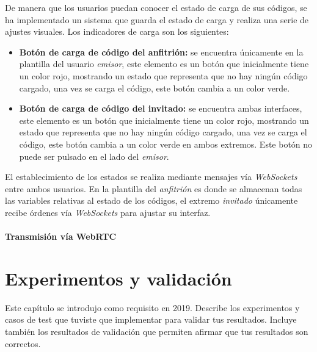 \documentclass[a4paper, 12pt]{book}
\begin{document}
De manera que los usuarios puedan conocer el estado de carga de sus códigos, se ha implementado un sistema que guarda el estado de carga y realiza una serie de ajustes visuales. Los indicadores de carga son los siguientes:

\begin{itemize}
\item \textbf{Botón de carga de código del anfitrión:} se encuentra únicamente en la plantilla del usuario \emph{emisor}, este elemento es un botón que inicialmente tiene un color rojo, mostrando un estado que representa que no hay ningún código cargado, una vez se carga el código, este botón cambia a un color verde.
\item \textbf{Botón de carga de código del invitado:} se encuentra ambas interfaces, este elemento es un botón que inicialmente tiene un color rojo, mostrando un estado que representa que no hay ningún código cargado, una vez se carga el código, este botón cambia a un color verde en ambos extremos. Este botón no puede ser pulsado en el lado del \emph{emisor}.
\end{itemize}


El establecimiento de los estados se realiza mediante mensajes vía \emph{WebSockets} entre ambos usuarios. En la plantilla del \emph{anfitrión} es donde se almacenan todas las variables relativas al estado de los códigos, el extremo \emph{invitado} únicamente recibe órdenes vía \emph{WebSockets} para ajustar su interfaz.

\subsubsection{Transmisión vía WebRTC}




\cleardoublepage
\chapter{Experimentos y validación}

Este capítulo se introdujo como requisito en 2019. 
Describe los experimentos y casos de test que tuviste que implementar para validar tus resultados. 
Incluye también los resultados de validación que permiten afirmar que tus resultados son correctos. 
\end{document}
